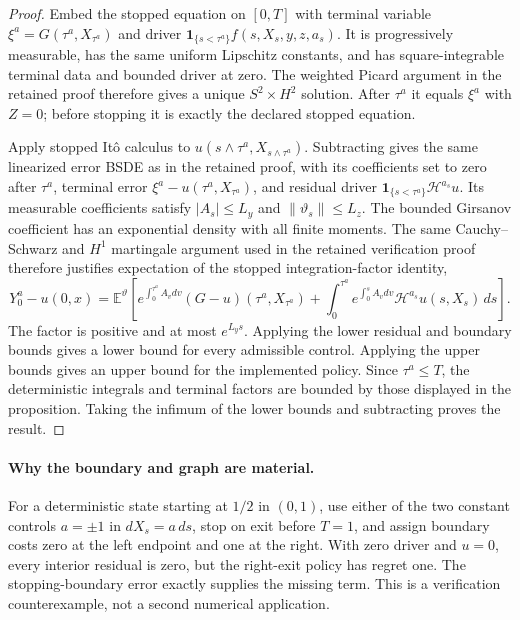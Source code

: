 \begin{proof}
Embed the stopped equation on $[0,T]$ with terminal variable
$\xi^a=G(\tau^a,X_{\tau^a})$ and driver
$\boldsymbol1_{\{s<\tau^a\}}f(s,X_s,y,z,a_s)$.
It is progressively measurable, has the same uniform Lipschitz
constants, and has square-integrable terminal data and bounded
driver at zero.  The weighted Picard argument in the retained proof
therefore gives a unique $S^2\times H^2$ solution.  After
$\tau^a$ it equals $\xi^a$ with $Z=0$; before stopping it
is exactly the declared stopped equation.

Apply stopped It\^o calculus to $u(s\wedge\tau^a,
X_{s\wedge\tau^a})$.  Subtracting gives the same linearized
error BSDE as in the retained proof, with its coefficients set to
zero after $\tau^a$, terminal error
$\xi^a-u(\tau^a,X_{\tau^a})$, and residual driver
$\boldsymbol1_{\{s<\tau^a\}}\mathcal H^{a_s}u$.
Its measurable coefficients satisfy $|A_s|\le L_y$ and
$\|\vartheta_s\|\le L_z$.  The bounded Girsanov coefficient
has an exponential density with all finite moments.  The same
Cauchy--Schwarz and $H^1$ martingale argument used in the
retained verification proof therefore justifies expectation of the
stopped integration-factor identity,
\[
 Y_0^a-u(0,x)=\mathbb E^{\vartheta}\left[
 e^{\int_0^{\tau^a}A_vdv}
       (G-u)(\tau^a,X_{\tau^a})
 +\int_0^{\tau^a}e^{\int_0^sA_vdv}
                \mathcal H^{a_s}u(s,X_s)\,ds\right].
\]
The factor is positive and at most $e^{L_ys}$.
Applying the lower residual and boundary bounds gives a lower
bound for every admissible control.  Applying the upper bounds
gives an upper bound for the implemented policy.  Since
$\tau^a\le T$, the deterministic integrals and terminal factors
are bounded by those displayed in the proposition.  Taking the
infimum of the lower bounds and subtracting proves the result.
\end{proof}

\paragraph{Why the boundary and graph are material.}
For a deterministic state starting at $1/2$ in $(0,1)$, use either
of the two constant controls $a=\pm1$ in $dX_s=a\,ds$,
stop on exit before $T=1$,
and assign boundary costs zero at the left endpoint and one at the
right.  With zero driver and $u=0$, every interior residual is
zero, but the right-exit policy has regret one.  The stopping-boundary
error exactly supplies the missing term.  This is a verification
counterexample, not a second numerical application.

